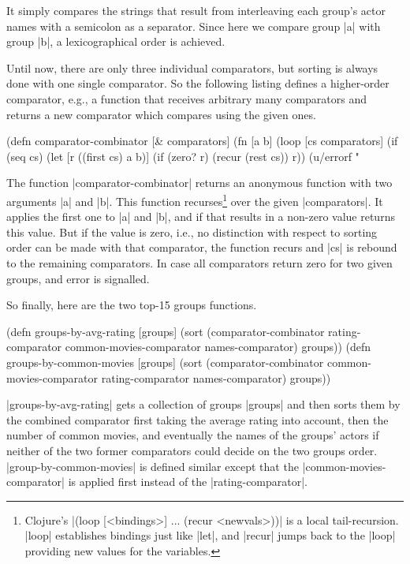 \documentclass[submission]{eptcs}
\newcommand{\code}{\clojureinline}
\begin{document}
It simply compares the strings that result from interleaving each group's actor
names with a semicolon as a separator.  Since here we compare group \code|a|
with group \code|b|, a lexicographical order is achieved.

Until now, there are only three individual comparators, but sorting is always
done with one single comparator.  So the following listing defines a
higher-order comparator, e.g., a function that receives arbitrary many
comparators and returns a new comparator which compares using the given ones.

\begin{clojurecode}
(defn comparator-combinator [& comparators]
  (fn [a b]
    (loop [cs comparators]
      (if (seq cs)
        (let [r ((first cs) a b)]
          (if (zero? r) (recur (rest cs)) r))
        (u/errorf "%
\end{clojurecode}

The function \code|comparator-combinator| returns an anonymous function with
two arguments \code|a| and \code|b|.  This function recurses\footnote{Clojure's
  \code|(loop [<bindings>] ... (recur <newvals>))| is a local tail-recursion.
  \code|loop| establishes bindings just like \code|let|, and \code|recur| jumps
  back to the \code|loop| providing new values for the variables.} over the
given \code|comparators|.  It applies the first one to \code|a| and \code|b|,
and if that results in a non-zero value returns this value.  But if the value
is zero, i.e., no distinction with respect to sorting order can be made with
that comparator, the function recurs and \code|cs| is rebound to the remaining
comparators.  In case all comparators return zero for two given groups, and
error is signalled.

So finally, here are the two top-15 groups functions.

\begin{clojurecode}
(defn groups-by-avg-rating [groups]
  (sort (comparator-combinator rating-comparator common-movies-comparator names-comparator) groups))
(defn groups-by-common-movies [groups]
  (sort (comparator-combinator common-movies-comparator rating-comparator names-comparator) groups))
\end{clojurecode}

\code|groups-by-avg-rating| gets a collection of groups \code|groups| and then
sorts them by the combined comparator first taking the average rating into
account, then the number of common movies, and eventually the names of the
groups' actors if neither of the two former comparators could decide on the two
groups order.  \code|group-by-common-movies| is defined similar except that the
\code|common-movies-comparator| is applied first instead of the
\code|rating-comparator|.
\end{document}
